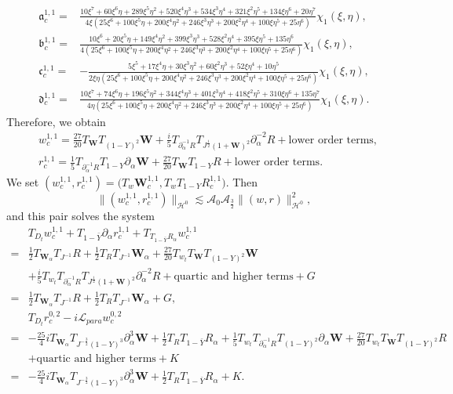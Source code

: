 \documentclass[10pt]{amsart}
\theoremstyle{remark}
\theoremstyle{definition}
\numberwithin{equation}{section}
\newcommand{\p}{\partial}
\renewcommand{\H}{{\mathcal H }}
\newcommand{\al}{\alpha}
\newcommand{\f}{\frac}
\newcommand{\bw}{\mathbf{W}}
\begin{document}
\begin{align*}
\mathfrak{a}^{1,1}_{c}=&\f{10\xi^7+60\xi^6\eta+289\xi^5\eta^2+520\xi^4\eta^3+534\xi^3\eta^4+321\xi^2\eta^5+134\xi \eta^6+20\eta^7}{4\xi(25\xi^6+100\xi^5\eta+200\xi^4\eta^2+246\xi^3\eta^3+200\xi^2\eta^4+100\xi\eta^5+25\eta^6)}\chi_{1}(\xi,\eta),\\
\mathfrak{b}^{1,1}_{c}=&\f{10\xi^6+20\xi^5\eta+149\xi^4\eta^2+399\xi^3\eta^3+528\xi^2\eta^4+395\xi\eta^5+135\eta^6}
{4(25\xi^6+100\xi^5\eta+200\xi^4\eta^2+246\xi^3\eta^3+200\xi^2\eta^4+100\xi\eta^5+25\eta^6)}\chi_{1}(\xi,\eta),\\
\mathfrak{c}^{1,1}_{c}=&-\f{5\xi^5+17\xi^4\eta+30\xi^3\eta^2+60\xi^2\eta^3+52\xi\eta^4+10\eta^5}
{2\xi\eta(25\xi^6+100\xi^5\eta+200\xi^4\eta^2+246\xi^3\eta^3+200\xi^2\eta^4+100\xi\eta^5+25\eta^6)}\chi_{1}(\xi,\eta),\\
\mathfrak{d}^{1,1}_{c}=&\f{10\xi^7+74\xi^6\eta + 196\xi^5\eta^2+344\xi^4\eta^3+401\xi^3\eta^4+418\xi^2\eta^5+310\xi\eta^6+135\eta^7}
{4\eta(25\xi^6+100\xi^5\eta+200\xi^4\eta^2+246\xi^3\eta^3+200\xi^2\eta^4+100\xi\eta^5+25\eta^6)}\chi_{1}(\xi,\eta).
\end{align*}
Therefore, we obtain
\begin{align*}
    &w^{1,1}_c = \f{27}{20}T_{\bw}T_{(1-Y)^2}\bw +\f{i}{5} T_{\p_\al^{-1}R}  T_{J^{\frac{1}{2}}(1+\bw)^2}  \p_\al^{-2}R + \text{lower order terms},\\
    &r^{1,1}_c = \f{1}{5} T_{\p_\al^{-1}R}T_{1-Y}\p_\al\bw+\f{27}{20} T_{\bw}T_{1-Y}  R + \text{lower order terms}.
\end{align*}
We set $(w^{1,1}_c, r^{1,1}_c) = \big(T_{w}\bw^{1,1}_c, T_{w}T_{1-Y}R^{1,1}_c \big)$. Then
\begin{equation*}
\|(w^{1,1}_c, r^{1,1}_c)\|_{\H^0}  \lesssim\mathcal{A}_0 \mathcal{A}_\f32\|(w,r)\|^2_{\H^0},
\end{equation*}
and this pair solves the system
\begin{align*} 
&T_{D_t}w^{1,1}_c+T_{1-\bar{Y}}\p_\al r^{1,1}_c+T_{T_{1-\bar{Y}}R_{\al}}w^{1,1}_c\\
=& \f12 T_{\bw_\al}T_{J^{-1}}R+\f12 T_R T_{J^{-1}}\bw_\al+\f{27}{20}T_{w_t}T_{\bw}T_{(1-Y)^2}\bw \\
&+\f{i}{5} T_{w_t}T_{\p_\al^{-1}R}  T_{J^{\frac{1}{2}}(1+\bw)^2}  \p_\al^{-2}R  + \text{quartic and higher terms} + G\\
=& \f12 T_{\bw_\al}T_{J^{-1}}R+\f12 T_R T_{J^{-1}}\bw_\al + G,\\
&T_{D_t}r^{0,2}_c-i\mathcal{L}_{para}w^{0,2}_c  \\
=& -\f{25}{4}i  T_{\bw_\al} T_{J^{-\f32}(1-Y)^3} \p_\al^3 \bw +\f12  T_R T_{1-\bar{Y}}R_\al+\f{1}{5} T_{w_t}T_{\p_\al^{-1}R}T_{(1-Y)^2}\p_\al\bw+\f{27}{20} T_{w_t}T_{\bw}T_{(1-Y)^2}  R \\
&+\text{quartic and higher terms} + K\\
=& -\f{25}{4}i  T_{\bw_\al} T_{J^{-\f32}(1-Y)^3} \p_\al^3 \bw +\f12  T_R T_{1-\bar{Y}}R_\al + K.
\end{align*}
\end{document}
